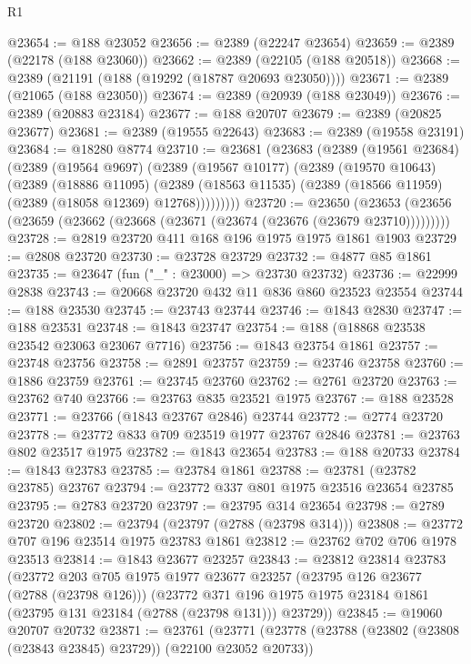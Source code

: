 \begin{lexlean}{R1}
\begin{coremodule}
@23654 := @188 @23052
@23656 := @2389 (@22247 @23654)
@23659 := @2389 (@22178 (@188 @23060))
@23662 := @2389 (@22105 (@188 @20518))
@23668 := @2389 (@21191 (@188 (@19292 (@18787 @20693 @23050))))
@23671 := @2389 (@21065 (@188 @23050))
@23674 := @2389 (@20939 (@188 @23049))
@23676 := @2389 (@20883 @23184)
@23677 := @188 @20707
@23679 := @2389 (@20825 @23677)
@23681 := @2389 (@19555 @22643)
@23683 := @2389 (@19558 @23191)
@23684 := @18280 @8774
@23710 := @23681
    (@23683
      (@2389
        (@19561 @23684)
        (@2389
          (@19564 @9697)
          (@2389
            (@19567 @10177)
            (@2389
              (@19570 @10643)
              (@2389
                (@18886 @11095)
                (@2389 (@18563 @11535) (@2389 (@18566 @11959) (@2389 (@18058 @12369) @12768)))))))))
@23720 := @23650
    (@23653 (@23656 (@23659 (@23662 (@23668 (@23671 (@23674 (@23676 (@23679 @23710)))))))))
@23728 := @2819 @23720 @411 @168 @196 @1975 @1975 @1861 @1903
@23729 := @2808 @23720
@23730 := @23728 @23729
@23732 := @4877 @85 @1861
@23735 := @23647 (fun ("_" : @23000) => @23730 @23732)
@23736 := @22999 @2838
@23743 := @20668 @23720 @432 @11 @836 @860 @23523 @23554
@23744 := @188 @23530
@23745 := @23743 @23744
@23746 := @1843 @2830
@23747 := @188 @23531
@23748 := @1843 @23747
@23754 := @188 (@18868 @23538 @23542 @23063 @23067 @7716)
@23756 := @1843 @23754 @1861
@23757 := @23748 @23756
@23758 := @2891 @23757
@23759 := @23746 @23758
@23760 := @1886 @23759
@23761 := @23745 @23760
@23762 := @2761 @23720
@23763 := @23762 @740
@23766 := @23763 @835 @23521 @1975
@23767 := @188 @23528
@23771 := @23766 (@1843 @23767 @2846) @23744
@23772 := @2774 @23720
@23778 := @23772 @833 @709 @23519 @1977 @23767 @2846
@23781 := @23763 @802 @23517 @1975
@23782 := @1843 @23654
@23783 := @188 @20733
@23784 := @1843 @23783
@23785 := @23784 @1861
@23788 := @23781 (@23782 @23785) @23767
@23794 := @23772 @337 @801 @1975 @23516 @23654 @23785
@23795 := @2783 @23720
@23797 := @23795 @314 @23654
@23798 := @2789 @23720
@23802 := @23794 (@23797 (@2788 (@23798 @314)))
@23808 := @23772 @707 @196 @23514 @1975 @23783 @1861
@23812 := @23762 @702 @706 @1978 @23513
@23814 := @1843 @23677 @23257
@23843 := @23812
    @23814
    @23783
    (@23772
      @203
      @705
      @1975
      @1977
      @23677
      @23257
      (@23795 @126 @23677 (@2788 (@23798 @126)))
      (@23772 @371 @196 @1975 @1975 @23184 @1861 (@23795 @131 @23184 (@2788 (@23798 @131))) @23729))
@23845 := @19060 @20707 @20732
@23871 := @23761
    (@23771
      (@23778
        (@23788 (@23802 (@23808 (@23843 @23845) @23729)) (@22100 @23052 @20733))

\end{coremodule}
\end{lexlean}
